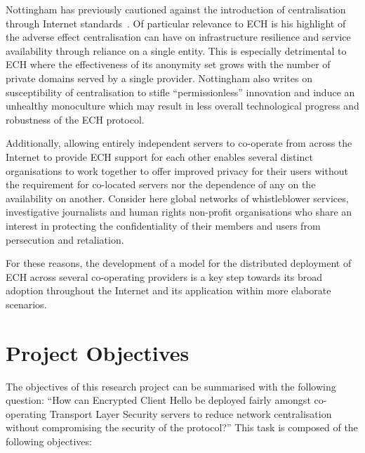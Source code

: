 Nottingham has previously cautioned against the introduction of centralisation through Internet standards~\cite{rfc9518}. Of particular relevance to ECH is his highlight of the adverse effect centralisation can have on infrastructure resilience and service availability through reliance on a single entity. This is especially detrimental to ECH where the effectiveness of its anonymity set grows with the number of private domains served by a single provider. Nottingham also writes on susceptibility of centralisation to stifle ``permissionless'' innovation and induce an unhealthy monoculture which may result in less overall technological progress and robustness of the ECH protocol.

Additionally, allowing entirely independent servers to co-operate from across the Internet to provide ECH support for each other enables several distinct organisations to work together to offer improved privacy for their users without the requirement for co-located servers nor the dependence of any on the availability on another. Consider here global networks of whistleblower services, investigative journalists and human rights non-profit organisations who share an interest in protecting the confidentiality of their members and users from persecution and retaliation.

For these reasons, the development of a model for the distributed deployment of ECH across several co-operating providers is a key step towards its broad adoption throughout the Internet and its application within more elaborate scenarios.









\section{Project Objectives}

The objectives of this research project can be summarised with the following question: ``How can Encrypted Client Hello be deployed fairly amongst co-operating Transport Layer Security servers to reduce network centralisation without compromising the security of the protocol?'' This task is composed of the following objectives:


